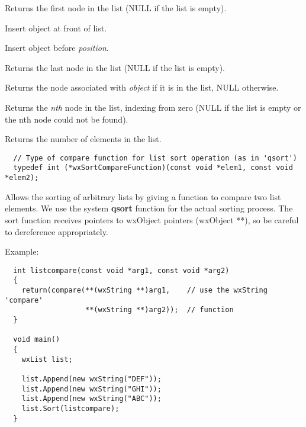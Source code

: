 

Returns the first node in the list (NULL if the list is empty).



Insert object at front of list.


Insert object before {\it position}.




Returns the last node in the list (NULL if the list is empty).



Returns the node associated with {\it object} if it is in the list, NULL otherwise.



Returns the {\it nth} node in the list, indexing from zero (NULL if the list is empty
or the nth node could not be found).



Returns the number of elements in the list.



\begin{verbatim}
  // Type of compare function for list sort operation (as in 'qsort')
  typedef int (*wxSortCompareFunction)(const void *elem1, const void *elem2);
\end{verbatim}

Allows the sorting of arbitrary lists by giving
a function to compare two list elements. We use the system {\bf qsort} function
for the actual sorting process. The sort function receives pointers to wxObject pointers (wxObject **),
so be careful to dereference appropriately.

Example:

\begin{verbatim}
  int listcompare(const void *arg1, const void *arg2)
  {
    return(compare(**(wxString **)arg1,    // use the wxString 'compare'
                   **(wxString **)arg2));  // function 
  }

  void main()
  {
    wxList list;

    list.Append(new wxString("DEF"));
    list.Append(new wxString("GHI"));
    list.Append(new wxString("ABC"));
    list.Sort(listcompare);
  }
\end{verbatim}

